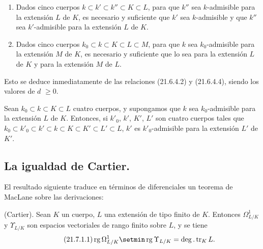 \begin{corollary}[21.6.5]
\label{0.21.6.5-fr}
\begin{enumerate}
  \item[\textup{(i)}] Dados cinco cuerpos $k\subset k'\subset k''\subset K\subset L$,
  para que $k''$ sea $k$-admisible para la extensión $L$ de $K$, es necesario y
  suficiente que $k'$ sea $k$-admisible y que $k''$ sea $k'$-admisible
  para la extensión $L$ de $K$.
  \item[\textup{(ii)}] Dados cinco cuerpos
  $k_0\subset k\subset K\subset L\subset M$, para que $k$ sea
  $k_0$-admisible para la extensión $M$ de $K$, es necesario y suficiente que lo
  sea para la extensión $L$ de $K$ y para la extensión $M$ de $L$.
\end{enumerate}

Esto se deduce inmediatamente de las relaciones (21.6.4.2) y (21.6.4.4), siendo
los valores de $d$ $\geqslant0$.
\end{corollary}

\begin{corollary}[21.6.6]
\label{0.21.6.6-fr}
Sean $k_0\subset k\subset K\subset L$ cuatro cuerpos, y supongamos que $k$
sea $k_0$-admisible para la extensión $L$ de $K$. Entonces, si $k'_0$, $k'$,
$K'$, $L'$ son cuatro cuerpos tales que
$k_0\subset k'_0\subset k'\subset k\subset K\subset K'\subset L'\subset L$,
$k'$ es $k'_0$-admisible para la extensión $L'$ de $K'$.
\end{corollary}

\subsection{La igualdad de Cartier.}
\label{subsection:0.21.7-fr}

El resultado siguiente traduce en términos de diferenciales un teorema de
MacLane sobre las derivaciones:

\begin{theorem}[21.7.1]
\label{0.21.7.1-fr}
\textnormal{(Cartier).}
Sean $K$ un cuerpo, $L$ una extensión de tipo finito de $K$. Entonces
$\Omega^1_{L/K}$ y $\Upsilon_{L/K}$ son espacios vectoriales de rango
finito sobre $L$, y se tiene
\begin{equation}
\tag{21.7.1.1}
\label{0.21.7.1.1-fr}
\operatorname{rg}\Omega^1_{L/K}\setmin\operatorname{rg}\Upsilon_{L/K}
=\deg.\operatorname{tr}_K L.
\end{equation}
\end{theorem}

